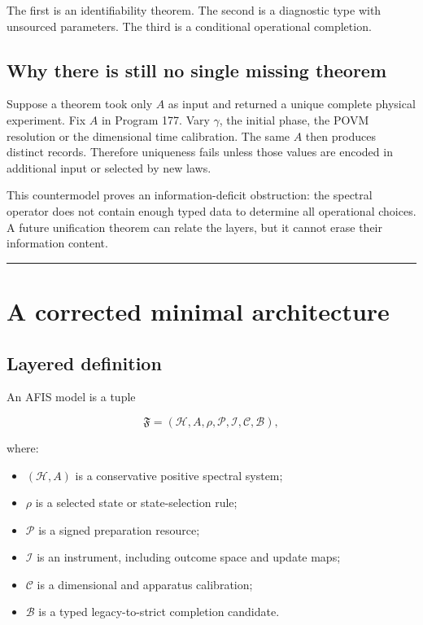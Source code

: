 \documentclass[11pt,a4paper,openany]{report}
\begin{document}
The first is an identifiability theorem. The second is a diagnostic type with unsourced parameters. The third is a conditional operational completion.

\section{Why there is still no single missing theorem}

Suppose a theorem took only \(A\) as input and returned a unique complete physical experiment. Fix \(A\) in Program 177. Vary \(\gamma\), the initial phase, the POVM resolution or the dimensional time calibration. The same \(A\) then produces distinct records. Therefore uniqueness fails unless those values are encoded in additional input or selected by new laws.

This countermodel proves an information-deficit obstruction: the spectral operator does not contain enough typed data to determine all operational choices. A future unification theorem can relate the layers, but it cannot erase their information content.

\par\medskip\hrule\medskip

\chapter{A corrected minimal architecture}

\section{Layered definition}

An AFIS model is a tuple

\[
\mathfrak F=
(\mathcal H,A,\rho,\mathcal P,\mathcal I,\mathcal C,\mathcal B),
\]

where:

\begin{itemize}
\item 
\((\mathcal H,A)\) is a conservative positive spectral system;

\item 
\(\rho\) is a selected state or state-selection rule;

\item 
\(\mathcal P\) is a signed preparation resource;

\item 
\(\mathcal I\) is an instrument, including outcome space and update maps;

\item 
\(\mathcal C\) is a dimensional and apparatus calibration;

\item 
\(\mathcal B\) is a typed legacy-to-strict completion candidate.

\end{itemize}
\end{document}
